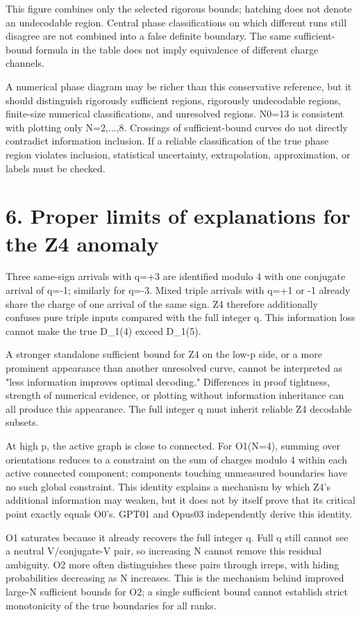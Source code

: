 \documentclass[11pt,a4paper]{article}
\begin{document}
This figure combines only the selected rigorous bounds; hatching does not denote an undecodable region. Central phase classifications on which different runs still disagree are not combined into a false definite boundary. The same sufficient-bound formula in the table does not imply equivalence of different charge channels.

A numerical phase diagram may be richer than this conservative reference, but it should distinguish rigorously sufficient regions, rigorously undecodable regions, finite-size numerical classifications, and unresolved regions. N0=13 is consistent with plotting only N=2,...,8. Crossings of sufficient-bound curves do not directly contradict information inclusion. If a reliable classification of the true phase region violates inclusion, statistical uncertainty, extrapolation, approximation, or labels must be checked.

\section*{6. Proper limits of explanations for the Z4 anomaly}

Three same-sign arrivals with q=+3 are identified modulo 4 with one conjugate arrival of q=-1; similarly for q=-3. Mixed triple arrivals with q=+1 or -1 already share the charge of one arrival of the same sign. Z4 therefore additionally confuses pure triple inputs compared with the full integer q. This information loss cannot make the true D\_1(4) exceed D\_1(5).

A stronger standalone sufficient bound for Z4 on the low-p side, or a more prominent appearance than another unresolved curve, cannot be interpreted as "less information improves optimal decoding." Differences in proof tightness, strength of numerical evidence, or plotting without information inheritance can all produce this appearance. The full integer q must inherit reliable Z4 decodable subsets.

At high p, the active graph is close to connected. For O1(N=4), summing over orientations reduces to a constraint on the sum of charges modulo 4 within each active connected component; components touching unmeasured boundaries have no such global constraint. This identity explains a mechanism by which Z4's additional information may weaken, but it does not by itself prove that its critical point exactly equals O0's. GPT01 and Opus03 independently derive this identity.

O1 saturates because it already recovers the full integer q. Full q still cannot see a neutral V/\allowbreak{}conjugate-V pair, so increasing N cannot remove this residual ambiguity. O2 more often distinguishes these pairs through irreps, with hiding probabilities decreasing as N increases. This is the mechanism behind improved large-N sufficient bounds for O2; a single sufficient bound cannot establish strict monotonicity of the true boundaries for all ranks.
\end{document}

